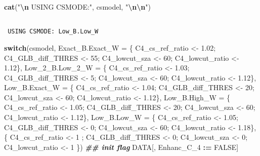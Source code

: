 \documentclass[
  10pt,
  a4paper,oneside]{article}
\newenvironment{Shaded}{\begin{snugshade}}{\end{snugshade}}
\newcommand{\AttributeTok}[1]{\textcolor[rgb]{0.13,0.29,0.53}{#1}}
\newcommand{\ConstantTok}[1]{\textcolor[rgb]{0.56,0.35,0.01}{#1}}
\newcommand{\ControlFlowTok}[1]{\textcolor[rgb]{0.13,0.29,0.53}{\textbf{#1}}}
\newcommand{\DecValTok}[1]{\textcolor[rgb]{0.00,0.00,0.81}{#1}}
\newcommand{\DocumentationTok}[1]{\textcolor[rgb]{0.56,0.35,0.01}{\textbf{\textit{#1}}}}
\newcommand{\FloatTok}[1]{\textcolor[rgb]{0.00,0.00,0.81}{#1}}
\newcommand{\FunctionTok}[1]{\textcolor[rgb]{0.13,0.29,0.53}{\textbf{#1}}}
\newcommand{\NormalTok}[1]{#1}
\newcommand{\OtherTok}[1]{\textcolor[rgb]{0.56,0.35,0.01}{#1}}
\newcommand{\SpecialCharTok}[1]{\textcolor[rgb]{0.81,0.36,0.00}{\textbf{#1}}}
\newcommand{\StringTok}[1]{\textcolor[rgb]{0.31,0.60,0.02}{#1}}
\begin{document}
\begin{Shaded}
\begin{Highlighting}[]
\FunctionTok{cat}\NormalTok{(}\StringTok{"}\SpecialCharTok{\textbackslash{}n}\StringTok{ USING CSMODE:"}\NormalTok{, csmodel, }\StringTok{"}\SpecialCharTok{\textbackslash{}n\textbackslash{}n}\StringTok{"}\NormalTok{)}
\end{Highlighting}
\end{Shaded}

\begin{verbatim}

 USING CSMODE: Low_B.Low_W 
\end{verbatim}

\begin{Shaded}
\begin{Highlighting}[]
\ControlFlowTok{switch}\NormalTok{(csmodel,}
       \AttributeTok{Exact\_B.Exact\_W =}\NormalTok{ \{ C4\_cs\_ref\_ratio }\OtherTok{\textless{}{-}} \FloatTok{1.02}\NormalTok{; C4\_GLB\_diff\_THRES }\OtherTok{\textless{}{-}} \DecValTok{55}\NormalTok{; C4\_lowcut\_sza }\OtherTok{\textless{}{-}} \DecValTok{60}\NormalTok{; C4\_lowcut\_ratio }\OtherTok{\textless{}{-}} \FloatTok{1.12}\NormalTok{\},}
       \AttributeTok{Low\_2\_B.Low\_2\_W =}\NormalTok{ \{ C4\_cs\_ref\_ratio }\OtherTok{\textless{}{-}} \FloatTok{1.03}\NormalTok{; C4\_GLB\_diff\_THRES }\OtherTok{\textless{}{-}}  \DecValTok{5}\NormalTok{; C4\_lowcut\_sza }\OtherTok{\textless{}{-}} \DecValTok{60}\NormalTok{; C4\_lowcut\_ratio }\OtherTok{\textless{}{-}} \FloatTok{1.12}\NormalTok{\},}
       \AttributeTok{Low\_B.Exact\_W   =}\NormalTok{ \{ C4\_cs\_ref\_ratio }\OtherTok{\textless{}{-}} \FloatTok{1.04}\NormalTok{; C4\_GLB\_diff\_THRES }\OtherTok{\textless{}{-}} \DecValTok{20}\NormalTok{; C4\_lowcut\_sza }\OtherTok{\textless{}{-}} \DecValTok{60}\NormalTok{; C4\_lowcut\_ratio }\OtherTok{\textless{}{-}} \FloatTok{1.12}\NormalTok{\},}
       \AttributeTok{Low\_B.High\_W    =}\NormalTok{ \{ C4\_cs\_ref\_ratio }\OtherTok{\textless{}{-}} \FloatTok{1.05}\NormalTok{; C4\_GLB\_diff\_THRES }\OtherTok{\textless{}{-}} \DecValTok{20}\NormalTok{; C4\_lowcut\_sza }\OtherTok{\textless{}{-}} \DecValTok{60}\NormalTok{; C4\_lowcut\_ratio }\OtherTok{\textless{}{-}} \FloatTok{1.12}\NormalTok{\},}
       \AttributeTok{Low\_B.Low\_W     =}\NormalTok{ \{ C4\_cs\_ref\_ratio }\OtherTok{\textless{}{-}} \FloatTok{1.05}\NormalTok{; C4\_GLB\_diff\_THRES }\OtherTok{\textless{}{-}}  \DecValTok{0}\NormalTok{; C4\_lowcut\_sza }\OtherTok{\textless{}{-}} \DecValTok{60}\NormalTok{; C4\_lowcut\_ratio }\OtherTok{\textless{}{-}} \FloatTok{1.18}\NormalTok{\},}
\NormalTok{                         \{ C4\_cs\_ref\_ratio }\OtherTok{\textless{}{-}} \DecValTok{1}\NormalTok{   ; C4\_GLB\_diff\_THRES }\OtherTok{\textless{}{-}}  \DecValTok{0}\NormalTok{; C4\_lowcut\_sza }\OtherTok{\textless{}{-}}  \DecValTok{0}\NormalTok{; C4\_lowcut\_ratio }\OtherTok{\textless{}{-}} \DecValTok{1}\NormalTok{   \})}
\DocumentationTok{\#\# init flag}
\NormalTok{DATA[, Enhanc\_C\_4 }\SpecialCharTok{:=} \ConstantTok{FALSE}\NormalTok{]}


\end{Highlighting}
\end{Shaded}
\end{document}
